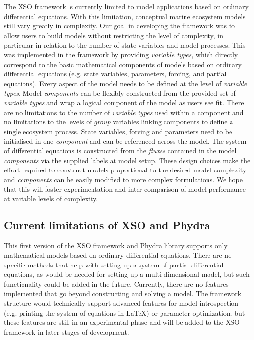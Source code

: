 \documentclass[journal abbreviation, manuscript]{copernicus}
\begin{document}
The XSO framework is currently limited to model applications based on ordinary differential equations. With this limitation, conceptual marine ecosystem models still vary greatly in complexity. Our goal in developing the framework was to allow users to build models without restricting the level of complexity, in particular in relation to the number of state variables and model processes. This was implemented in the framework by providing \textit{variable types}, which directly correspond to the basic mathematical components of models based on ordinary differential equations (e.g. state variables, parameters, forcing, and partial equations). Every aspect of the model needs to be defined at the level of \textit{variable types}. Model \textit{components} can be flexibly constructed from the provided set of \textit{variable types} and wrap a logical component of the model as users see fit. There are no limitations to the number of \textit{variable types} used within a component and no limitations to the levels of \textit{group} variables linking components to define a single ecosystem process. State variables, forcing and parameters need to be initialised in one \textit{component} and can be referenced across the model. The system of differential equations is constructed from the \textit{fluxes} contained in the model \textit{components} via the supplied labels at model setup. These design choices make the effort required to construct models proportional to the desired model complexity and \textit{components} can be easily modified to more complex formulations. We hope that this will foster experimentation and inter-comparison of model performance at variable levels of complexity. 


\subsection{Current limitations of XSO and Phydra}
This first version of the XSO framework and Phydra library supports only mathematical models based on ordinary differential equations. There are no specific methods that help with setting up a system of partial differential equations, as would be needed for setting up a multi-dimensional model, but such functionality could be added in the future. Currently, there are no features implemented that go beyond constructing and solving a model. The framework structure would technically support advanced features for model introspection (e.g. printing the system of equations in LaTeX) or parameter optimization, but these features are still in an experimental phase and will be added to the XSO framework in later stages of development.
\end{document}
